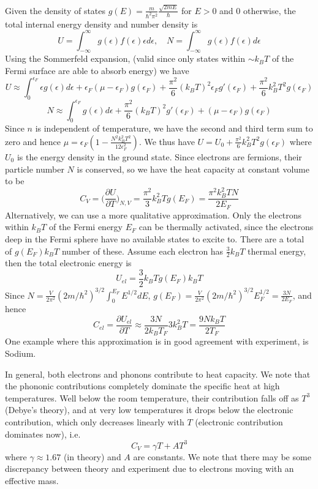 \documentclass[a4paper]{article}
\begin{document}
\begin{Note}
Given the density of states $g(E)=\frac{m}{\hbar^2\pi^2}\frac{\sqrt{2mE}}{\hbar}$ for $E>0$ and 0 otherwise, the total internal energy density and number density is
$$U=\int_{-\infty}^{\infty}g(\epsilon)f(\epsilon)\epsilon d\epsilon,\quad N=\int_{-\infty}^{\infty}g(\epsilon)f(\epsilon)d\epsilon$$
Using the Sommerfeld expansion, (valid since only states within $\sim k_BT$ of the Fermi surface are able to absorb energy) we have
$$U\approx\int_0^{\epsilon_F}\epsilon g(\epsilon)d\epsilon+\epsilon_F(\mu-\epsilon_F)g(\epsilon_F)+\frac{\pi^2}{6}(k_BT)^2 \epsilon_F g'(\epsilon_F)+\frac{\pi^2}{6}k_B^2T^2g(\epsilon_F)$$
$$N\approx\int_0^{\epsilon_F} g(\epsilon)d\epsilon+\frac{\pi^2}{6}(k_BT)^2g'(\epsilon_F)+(\mu-\epsilon_F)g(\epsilon_F)$$
Since $n$ is independent of temperature, we have the second and third term sum to zero and hence $\mu=\epsilon_F(1-\frac{N^2k_B^2T^2}{12\epsilon_F^2})$. We thus have $U=U_0+\frac{\pi^2}{6}k_B^2T^2g(\epsilon_F)$ where $U_0$ is the energy density in the ground state. Since electrons are fermions, their particle number $N$ is conserved, so we have the heat capacity at constant volume to be
$$C_V=\bigg(\frac{\partial U}{\partial T}\bigg)_{N,V}=\frac{\pi^2}{3}k_B^2Tg(E_F)=\frac{\pi^2k_B^2TN}{2E_F}$$
Alternatively, we can use a more qualitative approximation. Only the electrons within $k_BT$ of the Fermi energy $E_F$ can be thermally activated, since the electrons deep in the Fermi sphere have no available states to excite to. There are a total of $g(E_F)k_BT$ number of these. Assume each electron has $\frac{3}{2}k_BT$ thermal energy, then the total electronic energy is
$$U_{el}=\frac{3}{2}k_BTg(E_F)k_BT$$
Since $N=\frac{V}{2\pi^2}(2m/\hbar^2)^{3/2}\int_0^{E_F}E^{1/2}dE$, $g(E_F)=\frac{V}{2\pi^2}(2m/\hbar^2)^{3/2}E_F^{1/2}=\frac{3N}{2E_F}$, and hence 
$$C_{el}=\frac{\partial U_{el}}{\partial T}\approx\frac{3N}{2k_BT_F}3k_B^2T=\frac{9Nk_BT}{2T_F}$$
One example where this approximation is in good agreement with experiment, is Sodium.
\end{Note}
\begin{Note}
In general, both electrons and phonons contribute to heat capacity. We note that the phononic contributions completely dominate the specific heat at high temperatures. Well below the room temperature, their contribution falls off as $T^3$ (Debye's theory), and at very low temperatures it drops below the electronic contribution, which only decreases linearly with $T$ (electronic contribution dominates now), i.e. 
$$C_V=\gamma T+AT^3$$
where $\gamma\approx 1.67$ (in theory) and $A$ are constants. We note that there may be some discrepancy between theory and experiment due to electrons moving with an effective mass.
\end{Note}
\end{document}

